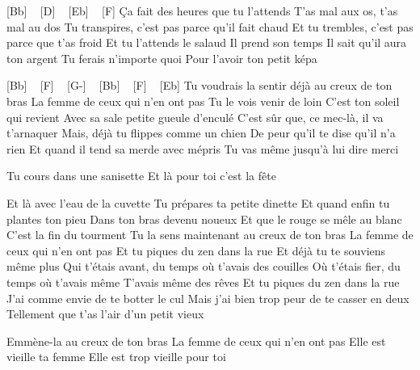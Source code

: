 [Bb] ~ [D] ~ [Eb] ~ [F]
Ça fait des heures que tu l'attends
T'as mal aux os, t'as mal au dos
Tu transpires, c'est pas parce qu'il fait chaud
Et tu trembles, c'est pas parce que t'as froid
Et tu l'attends le salaud
Il prend son temps
Il sait qu'il aura ton argent
Tu ferais n'importe quoi
Pour l'avoir ton petit képa

[Bb] ~ [F] ~ [G-] ~ [Bb] ~ [F] ~ [Eb]
Tu voudrais la sentir déjà au creux de ton bras
La femme de ceux qui n'en ont pas
Tu le vois venir de loin
C'est ton soleil qui revient
Avec sa sale petite gueule d'enculé
C'est sûr que, ce mec-là, il va t'arnaquer
Mais, déjà tu flippes comme un chien
De peur qu'il te dise qu'il n'a rien
Et quand il tend sa merde avec mépris
Tu vas même jusqu'à lui dire merci

Tu cours dans une sanisette
Et là pour toi c'est la fête

Et là avec l'eau de la cuvette
Tu prépares ta petite dinette
Et quand enfin tu plantes ton pieu
Dans ton bras devenu noueux
Et que le rouge se mêle au blanc
C'est la fin du tourment
Tu la sens maintenant au creux de ton bras
La femme de ceux qui n'en ont pas
Et tu piques du zen dans la rue
Et déjà tu te souviens même plus
Qui t'étais avant, du temps où t'avais des couilles
Où t'étais fier, du temps où t'avais même
T'avais même des rêves
Et tu piques du zen dans la rue
J'ai comme envie de te botter le cul
Mais j'ai bien trop peur de te casser en deux
Tellement que t'as l'air d'un petit vieux

Emmène-la au creux de ton bras
La femme de ceux qui n'en ont pas
Elle est vieille ta femme
Elle est trop vieille pour toi

